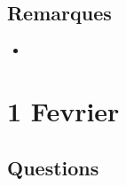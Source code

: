 \documentclass[a4paper, 11pt, hidelinks]{article}
\begin{document}
\subsection{Remarques}



\begin{itemize}
    \item 
\end{itemize}






\section{1 Fevrier}


\subsection{Questions}
\end{document}
